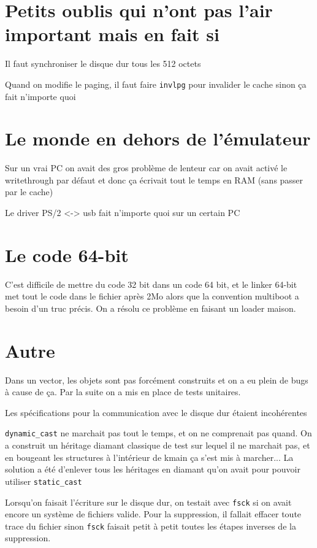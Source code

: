 \documentclass[12pt]{report}
\begin{document}
\section*{Petits oublis qui n'ont pas l'air important mais en fait si}

Il faut synchroniser le disque dur tous les 512 octets

Quand on modifie le paging, il faut faire \verb$invlpg$ pour invalider le cache sinon ça fait n'importe quoi

\section*{Le monde en dehors de l'émulateur}

Sur un vrai PC on avait des gros problème de lenteur car on avait activé le writethrough par défaut et donc ça écrivait tout le temps en RAM (sans passer par le cache)

Le driver PS/2 <-> usb fait n'importe quoi sur un certain PC

\section*{Le code 64-bit}

C'est difficile de mettre du code 32 bit dans un code 64 bit, et le linker 64-bit met tout le code dans le fichier après 2Mo alors que la convention multiboot a besoin d'un truc précis.
On a résolu ce problème en faisant un loader maison.

\section*{Autre}

Dans un vector, les objets sont pas forcément construits et on a eu plein de bugs à cause de ça.
Par la suite on a mis en place de tests unitaires.

Les spécifications pour la communication avec le disque dur étaient incohérentes

\verb$dynamic_cast$ ne marchait pas tout le temps, et on ne comprenait pas quand. On a construit un héritage diamant classique de test sur lequel il ne marchait pas, et en bougeant les structures à l'intérieur de kmain ça s'est mis à marcher...
La solution a été d'enlever tous les héritages en diamant qu'on avait pour pouvoir utiliser \verb$static_cast$

Lorsqu'on faisait l'écriture sur le disque dur, on testait avec \verb$fsck$ si on avait encore un système de fichiers valide. Pour la suppression, il fallait effacer toute trace du fichier sinon \verb$fsck$ faisait petit à petit toutes les étapes inverses de la suppression.





\end{document}
